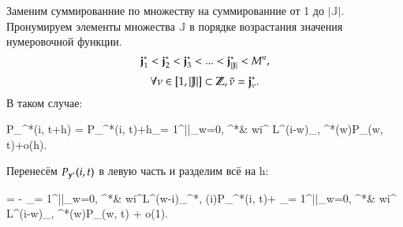Заменим суммированние по множеству на суммированние от 1 до \(|\mathbb{J}|\).
Пронумируем элементы множества \(\mathbb{J}\) в порядке возрастания значения нумеровочной функции.
\[\bold{j}^*_1 < \bold{j}^*_2 < \bold{j}^*_3 <... < \bold{j}^*_{|\mathbb{J}|} < M^n,\]
\[\forall \nu \in [1, |\mathbb{J}|] \subset \mathbb{Z}, \tilde{\nu} = \bold{j}^*_{\nu}.\]
В таком случае:
\begin{urv}{60}
	P_{^*}(i, t+h) = \left[1 - h 
	\sum_{\nu = 1}^{|\mathbb{J}|}\sum_{w=0,\atop \tilde{\nu} \neq \bold{y}^*\& w\neq i}^{\infty}
	L^{(w-i)}_{ \bold{y}^*, \tilde{\nu}}(i)\right]
	P_{^*}(i, t)+h\sum_{\nu = 1}^{||}\sum_{w=0,\atop \tilde{\nu} \neq {}^*\& w\neq i}^{\infty}
	L^{(i-w)}_{\tilde{\nu}, ^*}(w)P_{\tilde{\nu}}(w, t)+o(h).
\end{urv}
Перенесём \(P_{\bold{y}^*}(i, t)\) в левую часть и разделим всё на h:
\begin{urv}{60}
	  =
	- \sum_{\nu = 1}^{||}\sum_{w=0,\atop \tilde{\nu} \neq {}^*\& w\neq i}^{\infty}L^{(w-i)}_{^*, \tilde{\nu}}(i)P_{^*}(i, t)+
	\sum_{\nu = 1}^{||}\sum_{w=0,\atop \tilde{\nu} \neq {}^*\& w\neq i}^{\infty}
	L^{(i-w)}_{\tilde{\nu}, ^*}(w)P_{\tilde{\nu}}(w, t) + o(1).
\end{urv}
